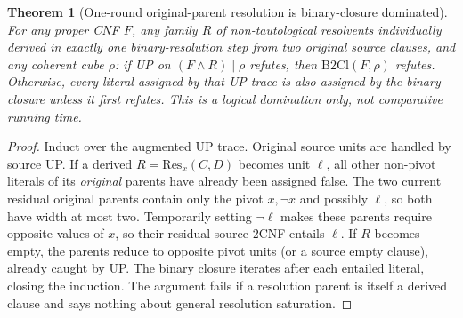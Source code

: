 \documentclass[10pt]{article}
\newtheorem{theorem}{Theorem}
\begin{document}
\begin{theorem}[One-round original-parent resolution is binary-closure dominated]
For any proper CNF $F$, any family $R$ of non-tautological resolvents individually derived in \emph{exactly one} binary-resolution step from two \emph{original source} clauses, and any coherent cube $\rho$: if UP on $(F\wedge R)\mid\rho$ refutes, then $\mathrm{B2Cl}(F,\rho)$ refutes. Otherwise, every literal assigned by that UP trace is also assigned by the binary closure unless it first refutes. This is a \emph{logical} domination only, not comparative running time.
\end{theorem}
\begin{proof}
Induct over the augmented UP trace. Original source units are handled by source UP. If a derived $R=\mathrm{Res}_x(C,D)$ becomes unit $\ell$, all other non-pivot literals of its \emph{original} parents have already been assigned false. The two current residual original parents contain only the pivot $x,\neg x$ and possibly $\ell$, so both have width at most two. Temporarily setting $\neg\ell$ makes these parents require opposite values of $x$, so their residual source 2CNF entails $\ell$. If $R$ becomes empty, the parents reduce to opposite pivot units (or a source empty clause), already caught by UP. The binary closure iterates after each entailed literal, closing the induction. The argument fails if a resolution parent is itself a derived clause and says nothing about general resolution saturation.
\end{proof}
\end{document}
